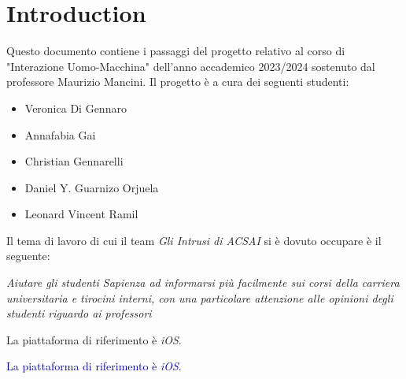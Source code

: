 \chapter*{Introduction}
  

Questo documento contiene i passaggi del progetto relativo
al corso di "Interazione Uomo-Macchina" dell'anno accademico 
2023/2024 sostenuto dal professore Maurizio Mancini.
Il progetto è a cura dei seguenti studenti:
\begin{itemize}
    \item Veronica Di Gennaro
    \item Annafabia Gai
    \item Christian Gennarelli
    \item Daniel Y. Guarnizo Orjuela
    \item Leonard Vincent Ramil
\end{itemize}

Il tema di lavoro di cui il team \textit{Gli Intrusi di ACSAI} 
si è dovuto occupare è il seguente:
\begin{center}
    \textit{Aiutare gli studenti Sapienza ad informarsi più facilmente sui corsi della carriera universitaria e tirocini interni, con una particolare attenzione alle opinioni degli studenti riguardo ai professori}
\end{center}
La piattaforma di riferimento è \textit{iOS}.

\textcolor{darkblue}{La piattaforma di riferimento è \textit{iOS}.}